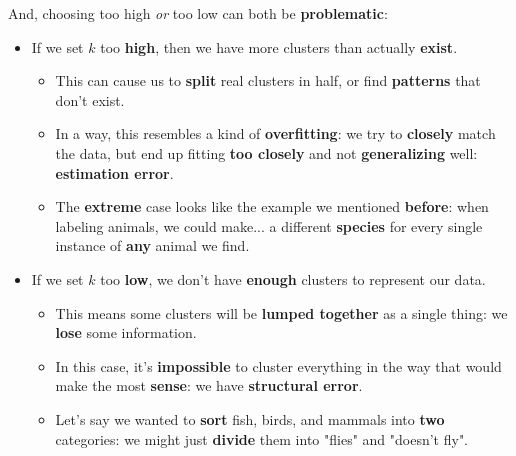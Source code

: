         And, choosing too high \textit{or} too low can both be \textbf{problematic}:
        
        \begin{itemize}
            \item If we set $k$ too \textbf{high}, then we have more clusters than actually \textbf{exist}.
                \begin{itemize}
                    \item This can cause us to \textbf{split} real clusters in half, or find \textbf{patterns} that don't exist.
                    
                    \item In a way, this resembles a kind of \textbf{overfitting}: we try to \textbf{closely} match the data, but end up fitting \textbf{too closely} and not \textbf{generalizing} well: \textbf{estimation error}.
                    
                    \item \miniex The \textbf{extreme} case looks like the example we mentioned \textbf{before}: when labeling animals, we could make... a different \textbf{species} for every single instance of \textbf{any} animal we find. 
                \end{itemize}
            \item If we set $k$ too \textbf{low}, we don't have \textbf{enough} clusters to represent our data.
                \begin{itemize}
                    \item This means some clusters will be \textbf{lumped together} as a single thing: we \textbf{lose} some information.
                    
                    \item In this case, it's \textbf{impossible} to cluster everything in the way that would make the most \textbf{sense}: we have \textbf{structural error}.
                    
                    \item \miniex Let's say we wanted to \textbf{sort} fish, birds, and mammals into \textbf{two} categories: we might just \textbf{divide} them into "flies" and "doesn't fly".
                        \\
                \end{itemize}
        \end{itemize}
        
